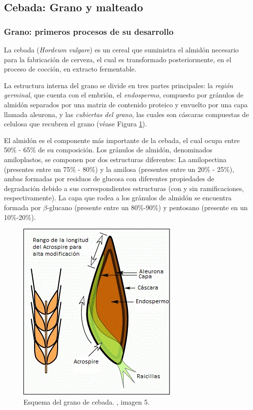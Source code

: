         
    	
        \subsection{Cebada: Grano y malteado}
            \subsubsection{Grano: primeros procesos de su desarrollo}
                \par La cebada (\textit{Hordeum vulgare}) es un cereal que suministra el almidón necesario para la fabricación de cerveza, el cual es transformado posteriormente, en el proceso de cocción, en extracto fermentable.
                \par La estructura interna del grano se divide en tres partes principales: la \textit{región germinal}, que cuenta con el embrión, el \textit{endospermo}, compuesto por gránulos de almidón separados por una matriz de contenido proteico y envuelto por una capa llamada aleurona, y las \textit{cubiertas del grano}, las cuales son cáscaras compuestas de celulosa que recubren el grano (véase Figura \ref{EstructuraGrano}).
        
                \par El almidón es el componente más importante de la cebada, el cual ocupa entre 50\% - 65\% de su composición. Los gránulos de almidón, denominados amiloplastos, se componen por dos estructuras diferentes: La amilopectina (presentes entre un 75\% - 80\%) y la amilosa (presentes entre un 20\% - 25\%), ambas formadas por residuos de glucosa con diferentes propiedades de degradación debido a sus correspondientes estructuras (con y sin ramificaciones, respectivamente). La capa que rodea a los gránulos de almidón se encuentra formada por $\beta$-glucano (presente entre un 80\%-90\%) y pentosano (presente en un 10\%-20\%).
        
                \begin{figure} [hb]
		            \centerline{\includegraphics[scale=0.9]{estructura_de_grano.jpg}}
		            \caption{ Esquema del grano de cebada. \cite{Palmer}, imagen 5. }
	                \label{EstructuraGrano}
    	        \end{figure}
    	
